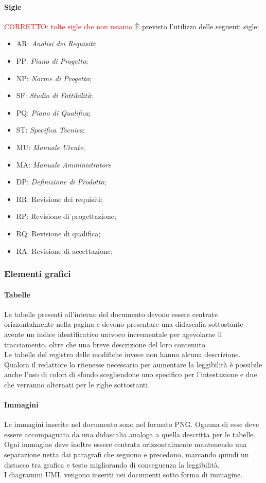 		\paragraph{Sigle} \Spazio
		\textcolor{red}{CORRETTO: tolte sigle che non usiamo}
		È previsto l’utilizzo delle seguenti sigle:
		\begin{itemize}
			\item AR: \textit{Analisi dei Requisiti};
			\item PP: \textit{Piano di Progetto};
			\item NP: \textit{Norme di Progetto};
			\item SF: \textit{Studio di Fattibilità};
			\item PQ: \textit{Piano di Qualifica};
			\item ST: \textit{Specifica Tecnica};
			\item MU: \textit{Manuale Utente};	
			\item MA: \textit{Manuale Amministratore}
			\item DP: \textit{Definizione di Prodotto};
			\item RR: Revisione dei requisiti;
			\item RP: Revisione di progettazione;
			\item RQ: Revisione di qualifica;
			\item RA: Revisione di accettazione;
		\end{itemize}
		
	\subsubsection{Elementi grafici}
		\paragraph{Tabelle}\Spazio
		Le tabelle presenti all'interno del documento devono essere centrate orizzontalmente nella pagina e devono presentare una didascalia sottostante avente un indice identificativo univoco incrementale per agevolarne il tracciamento, oltre che una breve descrizione del loro contenuto.\\
		Le tabelle del registro delle modifiche invece non hanno alcuna descrizione.
Qualora il redattore lo ritenesse necessario per aumentare la leggibilità è possibile anche l'uso di colori di sfondo scegliendone uno specifico per l'intestazione e due che verranno alternati per le righe sottostanti.

		\paragraph{Immagini}\Spazio
		Le immagini inserite nel documento sono nel formato PNG. Ognuna di esse deve essere accompagnata da una didascalia analoga a quella descritta per le tabelle. \\
		Ogni immagine deve inoltre essere centrata orizzontalmente mantenendo una separazione netta dai paragrafi che seguono e precedono, marcando quindi un distacco tra grafica e testo migliorando di conseguenza la leggibilità. \\
		I diagrammi UML vengono inseriti nei documenti sotto forma di immagine.
